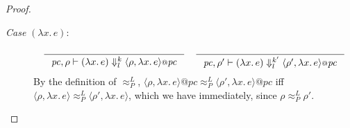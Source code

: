 \documentclass{article}
\makeatletter
\theoremstyle{definition}
\newcommand{\at}{\ensuremath{{\scriptstyle{@}}}}
\newcommand{\pc}{\ensuremath{{\mathit{pc}}}}
\makeatother
\begin{document}
\begin{proof}
\begin{description}
    
  \item[\emph{Case} $(\lambda{x}.\, e)$:]
    \begin{gather*}
      \inference{}{
        \pc, \rho |- (\lambda{x}.\, e) \Downarrow^{k}_{l}
        \langle{\rho, \lambda{x}.\, e\rangle} \at \pc
      }
      \quad
      \inference{}{
        \pc, \rho' |- (\lambda{x}.\, e) \Downarrow^{k'}_{l}
        \langle{\rho', \lambda{x}.\, e\rangle} \at \pc
      }
    \end{gather*}
    By the definition of $\approx^{L}_{P}$,
    $\langle{\rho, \lambda{x}.\, e\rangle} \at \pc
    \approx^{L}_{P}
    \langle{\rho', \lambda{x}.\, e\rangle} \at \pc$
    iff
    $\langle{\rho, \lambda{x}.\, e\rangle}
    \approx^{L}_{P}
    \langle{\rho', \lambda{x}.\, e\rangle}$,
    which we have immediately, since $\rho \approx^{L}_{P} \rho'$.
    

\end{description}
\end{proof}
\end{document}
